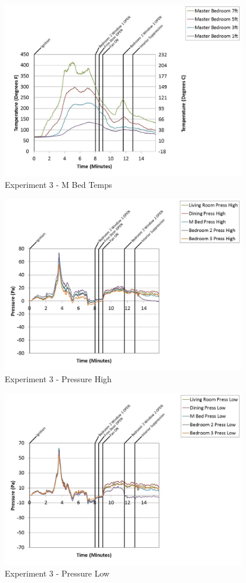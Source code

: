 \documentclass{article}
\begin{document}
\begin{appendices}
	\begin{figure}[h!]
		\centering
		\includegraphics[height=3.05in]{0_Images/Results_Charts/Exp_3_Charts/MBedTemps.pdf}
		\caption{Experiment 3 - M Bed Temps}
	\end{figure}
 
	\clearpage

	\begin{figure}[h!]
		\centering
		\includegraphics[height=3.05in]{0_Images/Results_Charts/Exp_3_Charts/PressureHigh.pdf}
		\caption{Experiment 3 - Pressure High}
	\end{figure}
 

	\begin{figure}[h!]
		\centering
		\includegraphics[height=3.05in]{0_Images/Results_Charts/Exp_3_Charts/PressureLow.pdf}
		\caption{Experiment 3 - Pressure Low}
	\end{figure}
 

\end{appendices}
\end{document}
